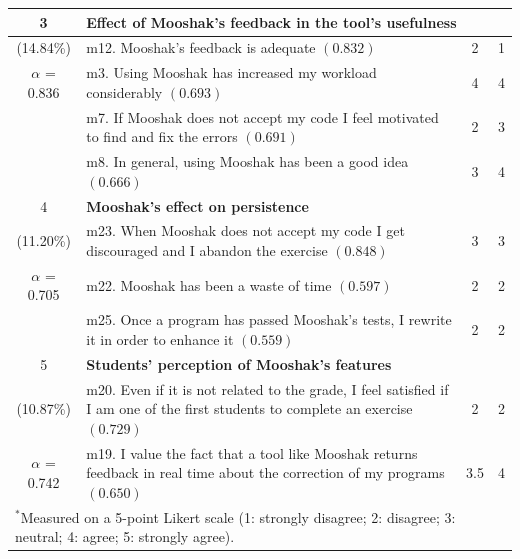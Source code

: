 \documentclass[12pt,twoside,titlepage]{report}
\begin{document}
\begin{table}
\begin{scriptsize}
\begin{tabular}{clcc}
   \hline
    3 & \multicolumn{3}{l}{\textbf{Effect of Mooshak's feedback in the tool's usefulness} } \\
   \hline
    (14.84\%) & m12. Mooshak's feedback is adequate $(0.832)$ & 2 & 1\\
    $\alpha$ = 0.836 & m3. Using Mooshak has increased my workload considerably $(0.693)$ & 4 & 4 \\
     & m7.  If Mooshak does not accept my code I feel motivated to find and fix the errors $(0.691)$ & 2 & 3 \\
     & m8.  In general, using Mooshak has been a good idea $(0.666)$ & 3 & 4 \\
   \hline
    4 & \multicolumn{3}{l}{\textbf{Mooshak's effect on persistence} } \\
   \hline
    (11.20\%) & m23. When Mooshak does not accept my code I get discouraged and I abandon the exercise $(0.848)$ & 3 & 3 \\
    $\alpha$ = 0.705 & m22. Mooshak has been a waste of time $(0.597)$ & 2 & 2 \\
    & m25. Once a program has passed Mooshak's tests, I rewrite it in order to enhance it $(0.559)$ & 2 & 2 \\
   \hline
   5 & \multicolumn{3}{l}{\textbf{Students' perception of Mooshak's features} } \\
   \hline
    (10.87\%) & m20. Even if it is not related to the grade, I feel satisfied if I am one of the first students to complete an exercise $(0.729)$ & 2 & 2\\
   $\alpha$ = 0.742  & m19. I value the fact that a tool like Mooshak returns feedback in real time about the correction of my programs $(0.650)$ & 3.5 & 4 \\
   \hline
\multicolumn{4}{l}{\scriptsize $^{*}$Measured on a 5-point Likert scale (1: strongly disagree; 2: disagree; 3: neutral; 4: agree; 5: strongly agree).}
  \end{tabular}
\end{scriptsize}
\end{table}
\end{document}
